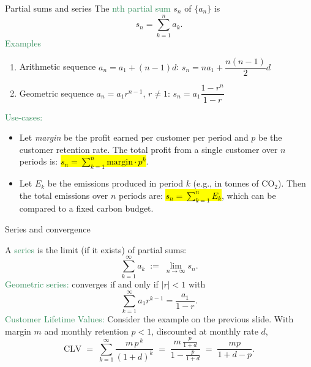 \documentclass[11pt,aspectratio=169]{beamer}
\begin{document}
\begin{frame}{Partial sums and series}
The \textcolor{SeaGreen}{nth partial sum} $s_n$ of $\{a_n\}$ is
\[
s_n=\sum_{k=1}^n a_k.
\]
\textcolor{SeaGreen}{Examples} 
\begin{enumerate}
\item Arithmetic sequence $a_n=a_1+(n-1)d$:\;\;\; $s_n=n a_1+\dfrac{n(n-1)}{2}d$
\item Geometric sequence $a_n=a_1 r^{n-1}$, $r\neq 1$:\;\;\; $s_n=a_1 \dfrac{1-r^n}{1-r}$
\end{enumerate}
\medskip
\textcolor{SeaGreen}{Use-cases:}
\begin{itemize}
\item Let \emph{margin} be the profit earned per customer per period and $p$ be the customer retention rate. The total profit from a single customer over \( n \) periods is: \hl{$s_n = \sum_{k=1}^n \text{margin} \cdot p^k$}.

\item  Let \( E_k \) be the emissions produced in period \( k \) (e.g., in tonnes of CO\(_2\)).  
Then the total emissions over \( n \) periods are: \hl{$s_n = \sum_{k=1}^n E_k$}, which can be compared to a fixed carbon budget.
\end{itemize}
\end{frame}

\begin{frame}{Series and convergence}

A \textcolor{SeaGreen}{series} is the limit (if it exists) of partial sums: 
\[
\sum_{k=1}^{\infty} a_k\; :=\; \lim_{n\to\infty} s_n.
\]
\textcolor{SeaGreen}{Geometric series:} converges if and only if $|r|<1$ with
\[
\sum_{k=1}^{\infty} a_1 r^{k-1}=\frac{a_1}{1-r}.
\]
\textcolor{SeaGreen}{Customer Lifetime Values:} Consider the example on the previous slide. With margin $m$ and monthly retention $p<1$, discounted at monthly rate $d$,
\[
\text{CLV}\;=\;\sum_{k=1}^\infty \frac{m\,p^{\,k}}{(1+d)^k}\;=\;\frac{m\,\frac{p}{1+d}}{1-\frac{p}{1+d}}\;=\;\frac{mp}{1+d-p}.
\]
\end{frame}
\end{document}
